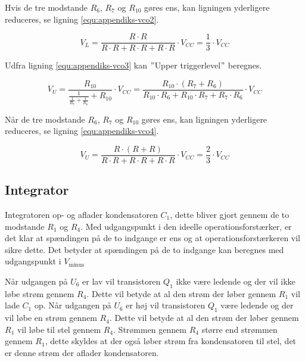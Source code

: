 Hvis de tre modstande $R_6$, $R_7$ og $R_{10}$ gøres ens, kan ligningen yderligere reduceres, se ligning \ref{equ:appendiks-vco2}.

\begin{equation}
\label{equ:appendiks-vco2}
V_L = \frac{R \cdot R}{R \cdot R + R \cdot R + R \cdot R} \cdot V_{CC} = \frac{1}{3} \cdot V_{CC}
\end{equation}

Udfra ligning \ref{equ:appendiks-vco3} kan $"$Upper triggerlevel$"$ beregnes.

\begin{equation}
\label{equ:appendiks-vco3}
V_U = \frac{R_{10}}{\frac{1}{\frac{1}{R_7} + \frac{1}{R_6}} + R_{10}} \cdot V_{CC} = \frac{R_{10} \cdot (R_7 + R_6)}{R_{10} \cdot R_6 + R_{10} \cdot R_7 + R_7 \cdot R_6} \cdot V_{CC}
\end{equation}

Når de tre modstande $R_6$, $R_7$ og $R_{10}$ gøres ens, kan ligningen yderligere reduceres, se ligning \ref{equ:appendiks-vco4}.

\begin{equation}
\label{equ:appendiks-vco4}
V_U = \frac{R \cdot (R + R)}{R \cdot R + R \cdot R + R \cdot R} \cdot V_{CC} = \frac{2}{3} \cdot V_{CC}
\end{equation}

\subsection*{Integrator}
Integratoren op- og aflader kondensatoren $C_1$, dette bliver gjort gennem de to modstande $R_1$ og $R_4$. Med udgangspunkt i den ideelle operationsforstærker, er det klar at spændingen på de to indgange er ens og at operationsforstærkeren vil sikre dette. Det betyder at spændingen på de to indgange kan beregnes med udgangspunkt i $V_{\mathrm{minus}}$

 Når udgangen på $U_6$ er lav vil transistoren $Q_1$ ikke være ledende og der vil ikke løbe strøm gennem $R_4$. Dette vil betyde at al den strøm der løber gennem $R_1$ vil lade $C_1$ op. Når udgangen på $U_6$ er høj vil transistoren $Q_1$ være ledende og der vil løbe en strøm gennem $R_4$. Dette vil betyde at al den strøm der løber gennem $R_1$ vil løbe til stel gennem $R_4$. Strømmen gennem $R_4$ større end strømmen gennem $R_1$, dette skyldes at der også løber strøm fra kondensatoren til stel, det er denne strøm der aflader kondensatoren.
